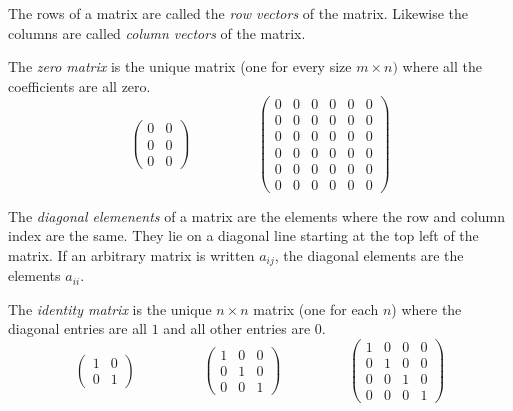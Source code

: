\documentclass[fleqn,letterpaper]{report}
\begin{document}
\begin{defn}
The rows of a matrix are called the \emph{row
vectors} of the matrix. Likewise the columns are called
\emph{column vectors} of the matrix.
\end{defn}

\begin{defn}
The \emph{zero matrix} is the unique matrix (one for every size $m
\times n)$ where all the coefficients are all zero.
\begin{displaymath}
\left(
\begin{matrix}
0 & 0 \\
0 & 0 \\
0 & 0 
\end{matrix}
\right)
\hspace{2cm}
\left(
\begin{matrix}
0 & 0 & 0 & 0 & 0 & 0 \\
0 & 0 & 0 & 0 & 0 & 0 \\
0 & 0 & 0 & 0 & 0 & 0 \\
0 & 0 & 0 & 0 & 0 & 0 \\
0 & 0 & 0 & 0 & 0 & 0 \\
0 & 0 & 0 & 0 & 0 & 0 
\end{matrix}
\right)
\end{displaymath}
\end{defn}

\begin{defn}
The \emph{diagonal elemenents} of a matrix are the elements
where the row and column index are the same. They lie on a
diagonal line starting at the top left of the matrix. If an
arbitrary matrix is written $a_{ij}$, the diagonal elements
are the elements $a_{ii}$. 
\end{defn}

\begin{defn}
The \emph{identity matrix} is the unique $n \times n$ matrix
(one for each $n$) where the diagonal entries are all
$1$ and all other entries are
$0$. 
\begin{displaymath}
\left( 
\begin{matrix}
1 & 0 \\
0 & 1
\end{matrix}
\right)
\hspace{2cm}
\left( 
\begin{matrix}
1 & 0 & 0 \\
0 & 1 & 0 \\
0 & 0 & 1 
\end{matrix}
\right)
\hspace{2cm}
\left( 
\begin{matrix}
1 & 0 & 0 & 0 \\
0 & 1 & 0 & 0 \\
0 & 0 & 1 & 0 \\
0 & 0 & 0 & 1
\end{matrix}
\right)
\end{displaymath}
\end{defn}
\end{document}
